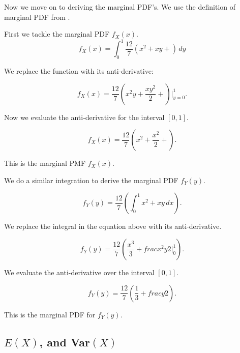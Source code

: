 \documentclass[a5paper,11pt]{article}
\begin{document}
Now we move on to deriving the marginal
PDF's.  We use the definition of 
marginal PDF from \cite{reading7}.

First we tackle the marginal PDF 
$f_X \left( x \right)$. 
\begin{equation}
f_{X}\left(x \right) =
\int_{0}^1 \frac{12}{7} 
  \left(x^2 + xy + \right) \,dy
\end{equation}

We replace the function with its 
anti-derivative:

\begin{equation}
f_{X}\left(x \right) =
\frac{12}{7} 
  \left(x^2y + \frac{xy^2}{2} + \right) 
  \bigg\rvert_{y=0}^1. 
\end{equation}

Now we evaluate the anti-derivative for the
interval $\left[0, 1 \right]$.

\begin{equation}
f_{X}\left(x \right) =
\frac{12}{7} 
  \left(x^2 + \frac{x^2}{2} + \right). 
\end{equation}

This is the marginal PMF 
$f_{X}\left( x \right)$.

We do a similar integration to derive the
marginal PDF $f_{Y}\left(y \right)$.

\begin{equation}
f_{Y}\left(y \right) =
\frac{12}{7} 
  \left( \int_0^1 x^2 + xy \,dx \right).
\end{equation}

We replace the integral in the equation
above with its anti-derivative.

\begin{equation}
f_{Y}\left(y \right) =
\frac{12}{7} 
  \left( \frac{x^3}{3} + frac{x^2y}{2}
 \bigg\rvert_{0}^{1}\right).
\end{equation}


We evaluate the anti-derivative over the
interval $\left[0, 1\right]$.

\begin{equation}
f_{Y}\left(y \right) =
\frac{12}{7} 
  \left( \frac{1}{3} + frac{y}{2} \right).
\end{equation}

This is the marginal PDF for 
$f_Y\left(y \right)$.

\subsection{$E\left(X \right)$, and 
Var$\left(X \right)$}
\end{document}
